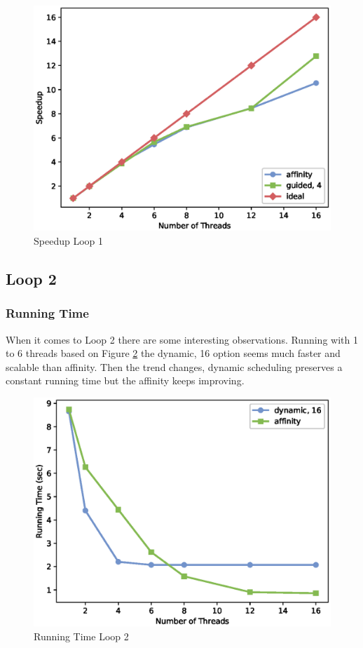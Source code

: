 \documentclass[12pt,a4paper]{article}
\begin{document}
\begin{figure}[h!]
    \centering
    \includegraphics[scale=0.6]{../graphs/loop1_speedup.eps}
    \caption{Speedup Loop 1}
    \label{speedupLoop1}
\end{figure}

\clearpage

\subsection{Loop 2}

\subsubsection{Running Time}

When it comes to Loop 2 there are some interesting observations. Running with 1 to 6 threads based on Figure \ref{runningTimeLoop2} the dynamic, 16 option seems much faster and scalable than affinity. Then the trend changes, dynamic scheduling preserves a constant running time but the affinity keeps improving.

\begin{figure}[h!]
	\centering
	\includegraphics[scale=0.6]{../graphs/loop2_running_time.eps}
	\caption{Running Time Loop 2}
	\label{runningTimeLoop2}
\end{figure}
\end{document}
